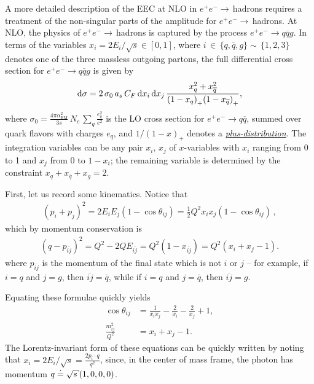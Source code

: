 A more detailed description of the EEC at NLO in \(e^+e^-\to\,\)hadrons requires a treatment of the non-singular parts of the amplitude for \(e^+ e^- \to\,\)hadrons.
%
At NLO, the physics of \(e^+ e^- \to\,\)hadrons is captured by the process \(e^+ e^- \to q \overline{q} g\).
%
In terms of the variables \(x_i = 2 E_i / \sqrt{s} \in [0, 1]\), where \(i\,\in\,\{q,\overline{q},g\}\sim\,\{1,2,3\}\) denotes one of the three massless outgoing partons, the full differential cross section for \(e^+e^-\to q \overline{q} g\) is given by
\begin{align}
    \dd \sigma
    =
    2\,\sigma_0
    \,
    a_s \, C_F
    \,
    \dd x_i\,\dd x_j
    \,
    \frac{x_q^2 + x_{\overline{q}}^2}{
          {(1-x_q)}_+
          {(1-x_{\overline{q}})}_+
    }
    ,
\end{align}
where \(
    \sigma_0 =
    \frac{4\pi \alpha_{\text{EM}}^2}{3 s}
    \,N_c\,\sum_q \frac{e_q^2}{e^2}
\)
is the LO cross section for \(e^+e^-\to q \overline{q}\), summed over quark flavors with charges \(e_q\), and \(1/{(1-x)}_+\) denotes a \hyperlink{footnote:plusfn_defn}{\textit{plus-distribution}}.
%
The integration variables can be any pair \(x_i,\,x_j\) of \(x\)-variables with \(x_i\) ranging from 0 to 1 and \(x_j\) from 0 to \(1-x_i\);
%
the remaining variable is determined by the constraint \(x_q + x_{\overline{q}} + x_g = 2\).


First, let us record some kinematics.
%
Notice that
\begin{align}
    (p_i + p_j)^2 = 2 E_i E_j (1 - \cos\theta_{ij}) = \frac{1}{2}Q^2 x_i x_j (1 - \cos\theta_{ij})
    \,,
\end{align}
which by momentum conservation is
\begin{align}
    (q - p_{\overline{ij}})^2 = Q^2 - 2 Q E_{\overline{ij}} = Q^2(1 - x_{\overline{ij}}) = Q^2(x_i + x_j - 1).
\end{align}
where \(p_{\overline{ij}}\) is the momentum of the final state which is not \(i\) or \(j\)
%
--
%
for example, if \(i=q\) and \(j = g\), then \(\overline{ij} = \bar{q}\), while if \(i=q\) and \(j = \bar{q}\), then \(\overline{ij} = g\).

Equating these formulae quickly yields
\begin{align}
    \cos\theta_{ij} &= \frac{1}{x_i x_j} - \frac{2}{x_i} - \frac{2}{x_j} + 1
    ,
    \\
    \frac{m^2_{ij}}{Q^2} &= x_i + x_j - 1
    .
\end{align}
%
The Lorentz-invariant form of these equations can be quickly written by noting that \(x_i = 2 E_i/\sqrt{s} = \frac{2 p_i\cdot q}{q^2}\), since, in the center of mass frame, the photon has momentum \(q \reppedby \sqrt{s}(1,0,0,0)\).


